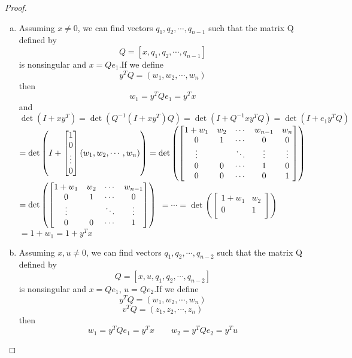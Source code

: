 \documentclass[11pt,a4paper]{article}
\renewcommand{\(}{\left(}
\renewcommand{\)}{\right)}
\begin{document}
  \begin{proof}
  \begin{enumerate}[(a)]
  \item Assuming $x\neq0$, we can find vectors $q_1,q_2,\cdots,q_{n-1}$ such that the matrix Q defined by
  \[ Q=[x,q_1,q_2,\cdots,q_{n-1}] \]
  is nonsingular and $x=Qe_1$.If we define
  \[ y^TQ=(w_1,w_2,\cdots,w_n) \]
  then
  \[ w_1=y^TQe_1=y^Tx \]
  and\\
  $ \det(I+xy^T)=\det(Q^{-1}(I+xy^T)Q)=\det(I+Q^{-1}xy^TQ)=\det(I+e_1y^TQ)$\\
  $ =\det\left(I+
    \begin{bmatrix}
 	 	1\\
 	 	0\\
 	 	\vdots\\
  		0\\
  	\end{bmatrix} 
  (w_1,w_2,\cdots,w_n)\right)=\det \left(
    \begin{bmatrix}
 	 	1+w_1 & w_2 & \cdots & w_{n-1} & w_n\\
 	 	0 & 1 & \cdots & 0 & 0\\
 	 	\vdots & \hfill & \ddots & \vdots & \vdots\\
 	 	0& 0 & \cdots & 1 & 0\\
  		0& 0 & \cdots & 0 & 1\\
  	\end{bmatrix} 
  \right) $\\
  $=\det \left(
    \begin{bmatrix}
 	 	1+w_1 & w_2 & \cdots & w_{n-1}\\
 	 	0 & 1 & \cdots & 0\\
 	 	\vdots & \hfill & \ddots & \vdots\\
  		0& 0 & \cdots & 1\\
  	\end{bmatrix} 
  \right)$
  $=\cdots=\det \left(
    \begin{bmatrix}
 	 	1+w_1 & w_2 \\
 	 	0 & 1 \\
  	\end{bmatrix} 
  \right)$\\
  $=1+w_1=1+y^Tx$
  \item Assuming $x,u\neq0$, we can find vectors $q_1,q_2,\cdots,q_{n-2}$ such that the matrix Q defined by
  \[ Q=[x,u,q_1,q_2,\cdots,q_{n-2}] \]
  is nonsingular and $x=Qe_1$, $u=Qe_2$.If we define
  \[ y^TQ=(w_1,w_2,\cdots,w_n) \]
  \[ v^TQ=(z_1,z_2,\cdots,z_n) \]
  then
  \[ w_1=y^TQe_1=y^Tx \qquad w_2=y^TQe_2=y^Tu \]

\end{enumerate}
\end{proof}
\end{document}
